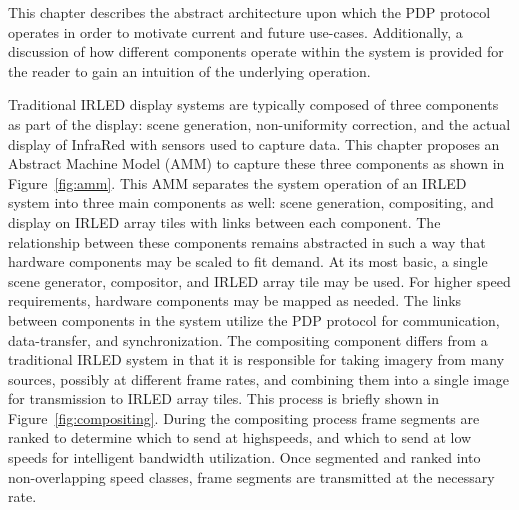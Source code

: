\label{chap:machine_model}


This chapter describes the abstract architecture upon which the PDP protocol operates in order to motivate current and future use-cases. Additionally, a discussion of how different components operate within the system is provided for the reader to gain an intuition of the underlying operation.

Traditional IRLED display systems are typically composed of three components as part of the display: scene generation, non-uniformity correction, and the actual display of InfraRed with sensors used to capture data. This chapter proposes an Abstract Machine Model (AMM) to capture these three components as shown in Figure~\ref{fig:amm}. This AMM separates the system operation of an IRLED system into three main components as well: scene generation, compositing, and display on IRLED array tiles with links between each component. The relationship between these components remains abstracted in such a way that hardware components may be scaled to fit demand. At its most basic, a single scene generator, compositor, and IRLED array tile may be used. For higher speed requirements, hardware components may be mapped as needed. The links between components in the system utilize the PDP protocol for communication, data-transfer, and synchronization. The compositing component differs from a traditional IRLED system in that it is responsible for taking imagery from many sources, possibly at different frame rates, and combining them into a single image for transmission to IRLED array tiles. This process is briefly shown in Figure~\ref{fig:compositing}. During the compositing process frame segments are ranked to determine which to send at highspeeds, and which to send at low speeds for intelligent bandwidth utilization. Once segmented and ranked into non-overlapping speed classes, frame segments are transmitted at the necessary rate.

